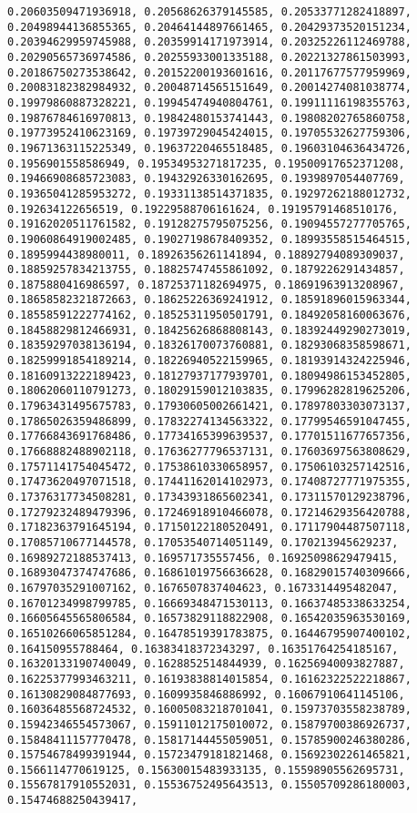 \documentclass[11pt]{article}
\begin{document}
\begin{Verbatim}[commandchars=\\\{\}]
0.20603509471936918, 0.20568626379145585, 0.20533771282418897, 0.20498944136855365, 0.20464144897661465, 0.20429373520151234, 0.20394629959745988, 0.20359914171973914, 0.20325226112469788, 0.20290565736974586, 0.20255933001335188, 0.20221327861503993, 0.20186750273538642, 0.20152200193601616, 0.20117677577959969, 0.20083182382984932, 0.20048714565151649, 0.20014274081038774, 0.19979860887328221, 0.19945474940804761, 0.19911116198355763, 0.19876784616970813, 0.19842480153741443, 0.19808202765860758, 0.19773952410623169, 0.19739729045424015, 0.19705532627759306, 0.19671363115225349, 0.19637220465518485, 0.19603104636434726, 0.1956901558586949, 0.19534953271817235, 0.19500917652371208, 0.19466908685723083, 0.19432926330162695, 0.1939897054407769, 0.19365041285953272, 0.19331138514371835, 0.19297262188012732, 0.192634122656519, 0.19229588706161624, 0.19195791468510176, 0.19162020511761582, 0.19128275795075256, 0.19094557277705765, 0.19060864919002485, 0.19027198678409352, 0.18993558515464515, 0.1895994438980011, 0.18926356261141894, 0.18892794089309037, 0.18859257834213755, 0.18825747455861092, 0.1879226291434857, 0.1875880416986597, 0.18725371182694975, 0.18691963913208967, 0.18658582321872663, 0.18625226369241912, 0.18591896015963344, 0.18558591222774162, 0.18525311950501791, 0.18492058160063676, 0.18458829812466931, 0.18425626868808143, 0.18392449290273019, 0.18359297038136194, 0.18326170073760881, 0.18293068358598671, 0.18259991854189214, 0.18226940522159965, 0.18193914324225946, 0.18160913222189423, 0.18127937177939701, 0.18094986153452805, 0.18062060110791273, 0.18029159012103835, 0.17996282819625206, 0.17963431495675783, 0.17930605002661421, 0.17897803303073137, 0.17865026359486899, 0.17832274134563322, 0.17799546591047455, 0.17766843691768486, 0.17734165399639537, 0.17701511677657356, 0.17668882488902118, 0.17636277796537131, 0.17603697563808629, 0.17571141754045472, 0.17538610330658957, 0.17506103257142516, 0.17473620497071518, 0.17441162014102973, 0.17408727771975355, 0.17376317734508281, 0.17343931865602341, 0.17311570129238796, 0.17279232489479396, 0.17246918910466078, 0.17214629356420788, 0.17182363791645194, 0.17150122180520491, 0.17117904487507118, 0.17085710677144578, 0.17053540714051149, 0.170213945629237, 0.16989272188537413, 0.169571735557456, 0.16925098629479415, 0.16893047374747686, 0.16861019756636628, 0.16829015740309666, 0.16797035291007162, 0.1676507837404623, 0.1673314495482047, 0.16701234998799785, 0.16669348471530113, 0.16637485338633254, 0.16605645565806584, 0.16573829118822908, 0.16542035963530169, 0.16510266065851284, 0.16478519391783875, 0.16446795907400102, 0.164150955788464, 0.16383418372343297, 0.16351764254185167, 0.16320133190740049, 0.1628852514844939, 0.16256940093827887, 0.16225377993463211, 0.16193838814015854, 0.16162322522218867, 0.16130829084877693, 0.1609935846886992, 0.16067910641145106, 0.16036485568724532, 0.16005083218701041, 0.15973703558238789, 0.15942346554573067, 0.15911012175010072, 0.15879700386926737, 0.15848411157770478, 0.15817144455059051, 0.15785900246380286, 0.15754678499391944, 0.15723479181821468, 0.15692302261465821, 0.1566114770619125, 0.15630015483933135, 0.15598905562695731, 0.15567817910552031, 0.15536752495643513, 0.15505709286180003, 0.15474688250439417, 
\end{Verbatim}
\end{document}
